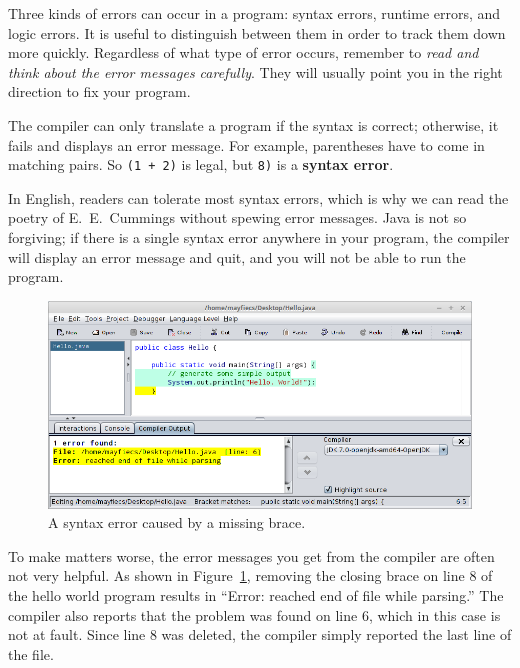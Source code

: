\documentclass[12pt]{book}
\makeatletter
\theoremstyle{exercise}
\newcommand{\java}[1]{\verb"#1"}
\renewcommand\subsection{\@startsection{subsection}{2}{\z@}%
    {-3.25ex\@plus -1ex \@minus -.2ex}%
    {0.3ex \@plus .2ex}%
    {\normalfont\large\bfseries}}
\newcommand{\java}[1]{\lstinline{#1}} %
\makeatother
\begin{document}

Three kinds of errors can occur in a program: syntax errors, runtime errors, and logic errors.
It is useful to distinguish between them in order to track them down more quickly.
Regardless of what type of error occurs, remember to {\em read and think about the error messages carefully}.
They will usually point you in the right direction to fix your program.



The compiler can only translate a program if the syntax is correct; otherwise, it fails and displays an error message.
For example, parentheses have to come in matching pairs.
So \java{(1 + 2)} is legal, but \java{8)} is a {\bf syntax error}.

In English, readers can tolerate most syntax errors, which is why we can read the poetry of E.\ E.\ Cummings without spewing error messages.
Java is not so forgiving; if there is a single syntax error anywhere in your program, the compiler will display an error message and quit, and you will not be able to run the program.

\begin{figure}[!h]
\begin{center}
\includegraphics[width=\textwidth]{figs/syntax-error.png}
\caption{A syntax error caused by a missing brace.}
\label{fig:syntax}
\end{center}
\end{figure}

To make matters worse, the error messages you get from the compiler are often not very helpful.
As shown in Figure~\ref{fig:syntax}, removing the closing brace on line 8 of the hello world program results in ``Error: reached end of file while parsing.''
The compiler also reports that the problem was found on line 6, which in this case is not at fault.
Since line 8 was deleted, the compiler simply reported the last line of the file.
\end{document}
